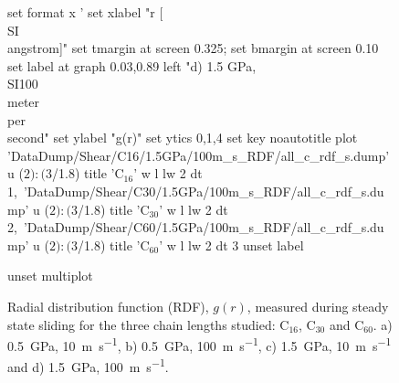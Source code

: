 \documentclass[5p]{elsarticle}
\begin{document}
\begin{figure}[htp]
\begin{center}
\begin{gnuplot}[terminal=epslatex, terminaloptions={size \SERFigwidth cm, \SERFigheight cm color solid}]
			set format x '%
			set xlabel "r [\\SI{}{\\angstrom}]"
			set tmargin at screen 0.325; set bmargin at screen 0.10
			set label at graph 0.03,0.89 left "d) 1.5 GPa, \\SI{100}{\\meter\\per\\second}"
			set ylabel "g(r)"
			set ytics 0,1,4
			set key noautotitle
			plot  	'DataDump/Shear/C16/1.5GPa/100m_s_RDF/all_c_rdf_s.dump' u  ($2):($3/1.8) title  'C$_{16}$' w l lw 2 dt 1,\
		        	'DataDump/Shear/C30/1.5GPa/100m_s_RDF/all_c_rdf_s.dump' u  ($2):($3/1.8) title  'C$_{30}$' w l lw 2 dt 2,\
		        	'DataDump/Shear/C60/1.5GPa/100m_s_RDF/all_c_rdf_s.dump' u  ($2):($3/1.8) title  'C$_{60}$' w l lw 2 dt 3
	    	unset label

			unset multiplot
		\end{gnuplot}
		\caption{Radial distribution function (RDF), $g(r)$,  measured during steady state sliding for the three chain lengths studied: C$_{16}$, C$_{30}$ and C$_{60}$. a) \SI{0.5}{\giga\pascal},  \SI{10}{\meter\per\second},   b) \SI{0.5}{\giga\pascal},  \SI{100}{\meter\per\second}, c) \SI{1.5}{\giga\pascal},  \SI{10}{\meter\per\second} and    d) \SI{1.5}{\giga\pascal},  \SI{100}{\meter\per\second}.
}
		\label{fig:RDF}
	\end{center}
 \end{figure}		
\end{document}
